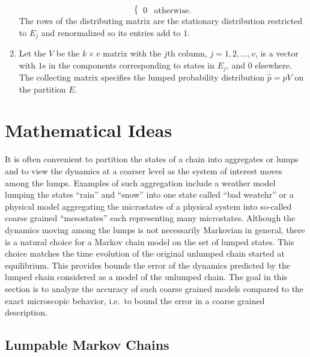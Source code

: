 \documentclass[12pt]{article}
\begin{document}
\begin{enumerate}
\[\begin{cases}
                0 & \text{otherwise}.
            \end{cases}
        \] The rows of the distributing matrix are the stationary
        distribution restricted to \( E_j \) and renormalized so its
        entries add to \( 1 \).
    \item
        Let the %
        \( V \) be the \( k \times v \) matrix with the \( j \)th
        column, \( j = 1, 2, \dots, v \), is a vector with \( 1 \)s in
        the components corresponding to states in \( E_j \), and \( 0 \)
        elsewhere.  The collecting matrix specifies the lumped
        probability distribution \( \hat{p} = p V \) on the partition \(
        E \).
\end{enumerate}

\hr

\section*{Mathematical Ideas}

It is often convenient to partition the states of a chain into
aggregates or lumps and to view the dynamics at a coarser level as the
system of interest moves among the lumps.  Examples of such aggregation
include a weather model lumping the states ``rain'' and ``snow'' into
one state called ``bad weatehr'' or a physical model aggregating the
microstates of a physical system into so-called coarse grained
``mesostates'' each representing many microstates.  Although the
dynamics moving among the lumps is not necessarily Markovian in general,
there is a natural choice for a Markov chain model on the set of lumped
states.  This choice matches the time evolution of the original unlumped
chain started at equilibrium. This provides bounds the error of the
dynamics predicted by the lumped chain considered as a model of the
unlumped chain.  The goal in this section is to analyze the accuracy of
such coarse grained models compared to the exact microscopic behavior,
i.e.\ to bound the error in a coarse grained description.

\subsection*{Lumpable Markov Chains}

\end{document}
